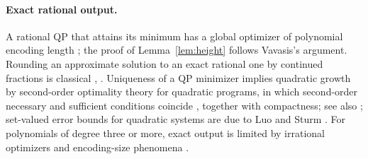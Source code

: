 \paragraph{Exact rational output.}
A rational QP that attains its minimum has a global optimizer of polynomial
encoding length \cite{Vavasis1990,DelPiaDeyMolinaro2017}; the proof of
Lemma~\ref{lem:height} follows Vavasis's argument. Rounding an approximate
solution to an exact rational one by continued fractions is classical
\cite[Section~5.1]{GrotschelLovaszSchrijver1988}, \cite{KozlovTarasovKhachiyan1980}.
Uniqueness of a QP minimizer implies quadratic growth by second-order
optimality theory for quadratic programs, in which second-order
necessary and sufficient conditions coincide \cite{Contesse1980}, together
with compactness; see also \cite{BonnansIoffe1995}; set-valued error bounds
for quadratic systems are due to Luo and Sturm \cite{LuoSturm2000}. For
polynomials of degree three or more, exact output is limited by irrational
optimizers and encoding-size phenomena \cite{BienstockDelPiaHildebrand2023}.

